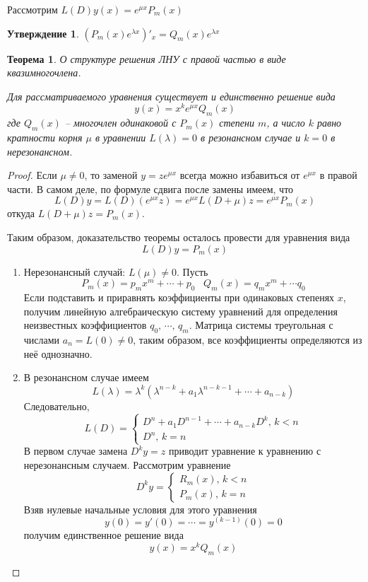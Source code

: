 \documentclass[a4paper,12pt]{article}
\theoremstyle{plain}
\newtheorem{theorem}{Теорема}[section]
\newtheorem{proposition}{Утверждение}[section]
\theoremstyle{definition}
\theoremstyle{remark}
\begin{document}
Рассмотрим $L(D)y(x) = e^{\mu x}P_m(x)$
\begin{proposition}
	$(P_m(x)e^{\lambda x})'_x = Q_m(x)e^{\lambda x}$
\end{proposition}

\begin{theorem}
	О структуре решения ЛНУ с правой частью в виде квазимногочлена.

	Для рассматриваемого уравнения существует и единственно решение вида
	\[y(x) = x^ke^{\mu x}Q_m(x)\]
	где $Q_m(x)$ -- многочлен одинаковой с $P_m(x)$ степени $m$, а число $k$ равно кратности корня $\mu$ в уравнении $L(\lambda) = 0$ в резонансном случае и $k = 0$ в нерезонансном.
\end{theorem}

\begin{proof}
	Если $\mu \neq 0$, то заменой $y = ze^{\mu x}$ всегда можно избавиться от $e^{\mu x}$ в правой части. В самом деле, по формуле сдвига после замены имеем, что
	\[L(D)y = L(D)(e^{\mu x}z) = e^{\mu x}L(D + \mu)z = e^{\mu x}P_m(x)\]
	откуда $L(D + \mu)z = P_m(x)$.

	Таким образом, доказательство теоремы осталось провести для уравнения вида
	\[L(D)y = P_m(x)\]

	\begin{enumerate}
		\item Нерезонансный случай: $L(\mu) \neq 0$. Пусть
		      \[P_m(x) = p_mx^m + \cdots + p_0\;\;\; Q_m(x) = q_mx^m + \cdots q_0\]
		      Если подставить и приравнять коэффициенты при одинаковых степенях $x$, получим линейную алгебраическую систему уравнений для определения неизвестных коэффициентов $q_0,\,\cdots,\,q_m$. Матрица системы треугольная с числами $a_n = L(0) \neq 0$, таким образом, все коэффициенты определяются из неё однозначно.
		\item В резонансном случае имеем
		      \[
			      L(\lambda) = \lambda^k(\lambda^{n - k} + a_1\lambda^{n - k - 1} + \cdots + a_{n - k})
		      \]
		      Следовательно,
		      \[
			      L(D) = \begin{cases}
				      D^n + a_1D^{n-1} + \cdots + a_{n - k}D^k,\, k < n \\
				      D^n,\, k = n
			      \end{cases}
		      \]
		      В первом случае замена $D^ky = z$ приводит уравнение к уравнению с нерезонансным случаем. Рассмотрим уравнение
		      \[
			      D^ky = \begin{cases}
				      R_m(x),\, k < n \\
				      P_m(x),\, k = n
			      \end{cases}
		      \]
		      Взяв нулевые начальные условия для этого уравнения
		      \[
			      y(0) = y'(0) = \cdots = y^{(k - 1)}(0) = 0
		      \]
		      получим единственное решение вида
		      \[
			      y(x) = x^kQ_m(x)
		      \]
	\end{enumerate}
\end{proof}
\end{document}
